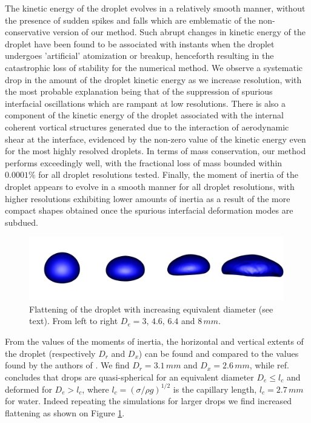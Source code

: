 The kinetic energy of the droplet evolves in a relatively smooth manner, without the presence of sudden spikes and falls which are emblematic of the non-conservative version of our method. Such abrupt changes in kinetic energy of the droplet have been found to be associated with instants when the droplet undergoes 'artificial' atomization or breakup, henceforth resulting in the catastrophic loss of stability for the numerical method. We observe a systematic drop in the amount of the droplet kinetic energy as we increase resolution, with the most probable explanation being that of the suppression of spurious interfacial oscillations which are rampant at low resolutions. There is also a component of the kinetic energy of the droplet associated with the internal coherent vortical structures generated due to the interaction of aerodynamic shear at the interface, evidenced by the non-zero value of the kinetic energy even for the most highly resolved droplets. In terms of mass conservation, our method performs exceedingly well, with the fractional loss of mass bounded within $0.0001 \%$ for all droplet resolutions tested. Finally, the moment of inertia of the droplet appears to evolve in a smooth manner for all droplet resolutions, with higher resolutions exhibiting lower amounts of inertia as a result of the more compact shapes obtained once the spurious interfacial deformation modes are subdued.          

\begin{figure}[h!]
\begin{center}
\includegraphics[width=0.99\textwidth]{Figures/flatten.png}
\end{center}
\caption{Flattening of the droplet with increasing equivalent diameter 
(see text). From left to right $D_e=3, \,4.6,\, 6.4$ and $8\, mm$.}
\label{flatten}
\end{figure}

From the values of the moments of inertia, the horizontal and vertical 
extents of the droplet (respectively $D_r$ and $D_x$) can be found 
and compared to the values found by the authors of \cite{Reyssat:2007ko}. 
We find $D_r=3.1 \,mm$ and $D_x=2.6 \,mm$, while ref. \cite{Reyssat:2007ko} 
concludes that drops are quasi-spherical for an equivalent diameter 
$D_e \le l_c$ and deformed for $D_e > l_c$, where $l_c =(\sigma/\rho g)^{1/2}$ 
is the capillary length, $l_c = 2.7 \,mm$ for water. 
Indeed repeating the simulations for larger drops we find increased 
flattening as shown on Figure \ref{flatten}. 

